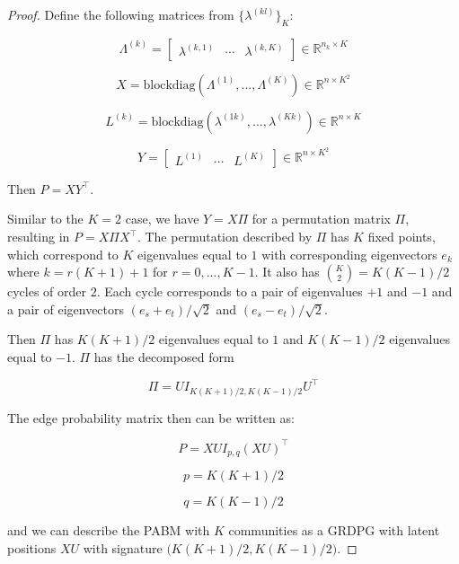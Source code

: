 \documentclass[
  12pt,
]{article}
\begin{document}
\begin{proof}
Define the following matrices from $\{\lambda^{(kl)}\}_K$: 

$$\Lambda^{(k)} = 
\begin{bmatrix} \lambda^{(k,1)} & \cdots & \lambda^{(k, K)} \end{bmatrix}
\in \mathbb{R}^{n_k \times K}$$

\begin{equation} \label{eq:xy}
X = \text{blockdiag}(\Lambda^{(1)}, ..., \Lambda^{(K)}) \in \mathbb{R}^{n \times K^2}
\end{equation}

$$L^{(k)} = \text{blockdiag}(\lambda^{(1k)}, ..., \lambda^{(Kk)}) \in 
\mathbb{R}^{n \times K}$$

$$Y = \begin{bmatrix} L^{(1)} & \cdots & L^{(K)} \end{bmatrix} \in 
\mathbb{R}^{n \times K^2}$$

Then $P = X Y^\top$.

Similar to the $K = 2$ case, we have $Y = X \Pi$ for a permutation matrix
$\Pi$, resulting in $P = X \Pi X^\top$.  
The permutation described by $\Pi$ has $K$ fixed points, which correspond to 
$K$ eigenvalues equal to $1$ with corresponding eigenvectors $e_k$ where 
$k = r (K + 1) + 1$ for $r = 0, ..., K - 1$. It also has 
$\binom{K}{2} = K (K - 1) / 2$ cycles of order $2$. Each cycle corresponds to 
a pair of eigenvalues $+1$ and $-1$ and a pair of eigenvectors 
$(e_s + e_t) / \sqrt{2}$ and $(e_s - e_t) / \sqrt{2}$.

Then $\Pi$ has $K (K + 1) / 2$ eigenvalues equal to $1$ and $K (K - 1) / 2$ 
eigenvalues equal to $-1$. $\Pi$ has the decomposed form 

\begin{equation} \label{eq:permutation}
\Pi = U I_{K (K + 1) / 2, K (K - 1) / 2} U^\top
\end{equation}

The edge probability matrix then can be written as:

\begin{equation} \label{eq:pabm-grdpg}
P = X U I_{p, q} (X U)^\top
\end{equation}

\begin{equation} \label{eq:p}
p = K (K + 1) / 2
\end{equation}

\begin{equation} \label{eq:q}
q = K (K - 1) / 2
\end{equation}

and we can describe the PABM with $K$ communities as a GRDPG with latent 
positions $X U$ with signature $\big( K (K + 1) / 2, K (K - 1) / 2 \big)$.
\end{proof}
\end{document}
